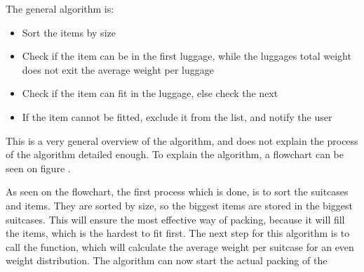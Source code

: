The general algorithm is:
\begin{itemize}
	\item Sort the items by size
	\item Check if the item can be in the first luggage, while the luggages total weight does not exit the average weight per luggage
	\item	Check if the item can fit in the luggage, else check the next
	\item  If the item cannot be fitted, exclude it from the list, and notify the user
\end{itemize}

This is a very general overview of the algorithm, and does not explain the process of the algorithm detailed enough. To explain the algorithm, a flowchart can be seen on figure .

As seen on the flowchart, the first process which is done, is to sort the suitcases and items. They are sorted by size, so the biggest items are stored in the biggest suitcases. This will ensure the most effective way of packing, because it will fill the items, which is the hardest to fit first. The next step for this algorithm is to call the function, which will calculate the average weight per suitcase for an even weight distribution. The algorithm can now start the actual packing of the 